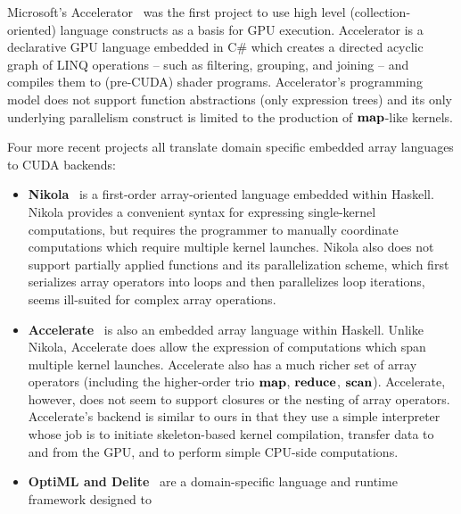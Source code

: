 \documentclass[preprint]{sigplanconf}
\begin{document}
Microsoft's Accelerator~\cite{Tard06} was the first project to use high level (collection-oriented) language constructs as a basis for GPU execution. Accelerator is a declarative GPU language embedded in C\# which creates a directed acyclic graph of LINQ operations -- such as filtering, grouping, and joining -- and compiles them to (pre-CUDA) shader programs. Accelerator's programming model does not support function abstractions (only expression trees) and its only underlying parallelism construct is limited to the production of $\mbox{\textbf{map}}$-like kernels.

Four more recent projects all translate domain specific embedded array languages to CUDA backends:
\begin{itemize}
\item \textbf{Nikola}~\cite{Main10} is a first-order array-oriented language embedded within Haskell. Nikola provides a convenient syntax for expressing single-kernel computations, but requires the programmer to manually coordinate computations which require multiple kernel launches. Nikola also does not support partially applied functions and its parallelization scheme, which first serializes array operators into loops and then parallelizes loop iterations, seems ill-suited for complex array operations.

\item \textbf{Accelerate}~\cite{Chak11} is also an embedded array language within Haskell. Unlike Nikola, Accelerate does allow the expression of computations which span multiple kernel launches. Accelerate also has a much richer set of array operators (including the higher-order trio $\mbox{\textbf{map}}$, $\mbox{\textbf{reduce}}$, $\mbox{\textbf{scan}}$). Accelerate, however, does not seem to support closures or the nesting of array operators. Accelerate's backend is similar to ours in that they use a simple interpreter whose job is to initiate skeleton-based kernel compilation, transfer data to and from the GPU, and to perform simple CPU-side computations.

\item \textbf{OptiML and Delite}~\cite{Chaf11} are a domain-specific language and runtime framework designed to 


\end{itemize}
\end{document}
